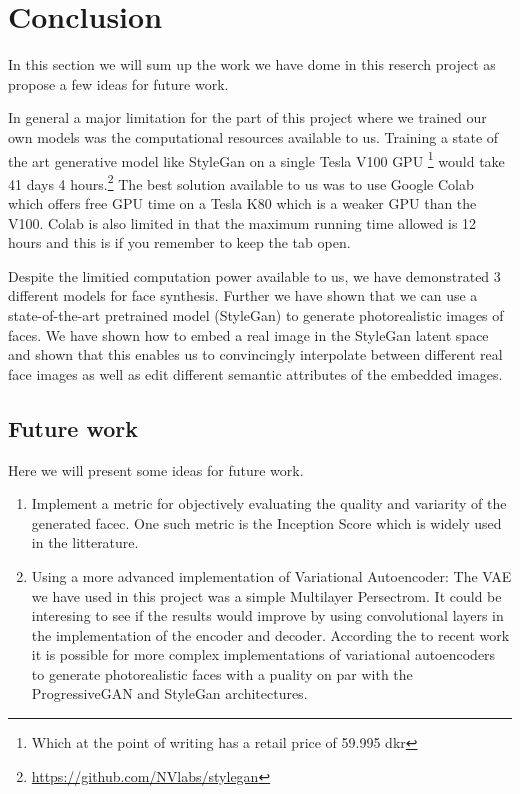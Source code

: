 
\section{Conclusion}


In this section we will sum up the work we have dome in this reserch project as propose a few ideas for future work.

In general a major limitation for the part of this project where we trained our own models was the computational resources available to us.  
Training a state of the art generative model like StyleGan on a single Tesla V100 GPU \footnote{Which at the point of writing has a retail price of 59.995 dkr} would take 41 days 4 hours.\footnote{\url{https://github.com/NVlabs/stylegan}} 
The best solution available to us was to use Google Colab which offers free GPU time on a Tesla K80 which is a weaker GPU than the V100. Colab is also limited in that the maximum running time allowed is 12 hours and this is if you remember to keep the tab open.

Despite the limitied computation power available to us, we have demonstrated 3 different models for face synthesis.
Further we have shown that we can use a state-of-the-art pretrained model (StyleGan) to generate photorealistic images of faces. We have shown how to embed a real image in the StyleGan latent space and shown that this enables us to convincingly interpolate between different real face images as well as edit different semantic attributes of the embedded images. 




\subsection{Future work}

Here we will present some ideas for future work. 
\begin{enumerate}
    \item Implement a metric for objectively evaluating the quality and variarity of the generated facec. One such metric is the Inception Score which is widely used in the litterature. 
    
    \item Using a more advanced implementation of Variational Autoencoder: The VAE we have used in this project was a simple Multilayer Persectrom. It could be interesing to see if the results would improve by using convolutional layers in the implementation of the encoder and decoder.  According the to recent work \cite{vqvae2} it is possible for more complex implementations of variational autoencoders to generate photorealistic faces with a puality on par with the ProgressiveGAN and StyleGan architectures.
\end{enumerate}